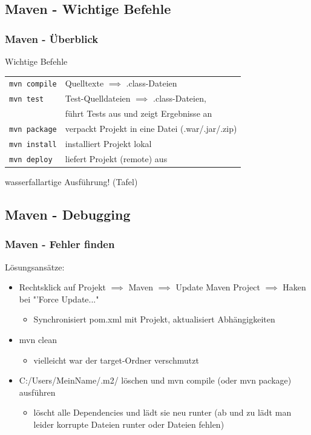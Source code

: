 \documentclass[18pt]{beamer}
\begin{document}
	\subsection{Maven - Wichtige Befehle}
	\begin{frame}
		\frametitle{Maven - Überblick}
		\begin{block}{Wichtige Befehle}
			\begin{tabular}{ll}
				\texttt{mvn compile} & Quelltexte $\implies$ .class-Dateien \\ \pause
				\texttt{mvn test} & Test-Quelldateien $\implies$ .class-Dateien, \\ & führt Tests aus und zeigt Ergebnisse an \\ \pause
				\texttt{mvn package} & verpackt Projekt in eine Datei (.war/.jar/.zip) \\ \pause 
				\texttt{mvn install} & installiert Projekt lokal \\ \pause
				\texttt{mvn deploy} & liefert Projekt (remote) aus
			\end{tabular}
		\end{block}
		wasserfallartige Ausführung! (Tafel)
	\end{frame}
	
	\subsection{Maven - Debugging}
	\begin{frame}
		\frametitle{Maven - Fehler finden}
		Lösungsansätze:
		\begin{itemize}
			\item Rechtsklick auf Projekt $\implies$ Maven $\implies$ Update Maven Project $\implies$ Haken bei "'Force Update..." 
			\begin{itemize}
				\item Synchronisiert pom.xml mit Projekt, aktualisiert Abhängigkeiten
			\end{itemize}
			\pause
			\item mvn clean
			\begin{itemize}
				\item vielleicht war der target-Ordner verschmutzt
			\end{itemize}
			\pause
			\item C:/Users/MeinName/.m2/ löschen und mvn compile (oder mvn package) ausführen
			\begin{itemize}
				\item löscht alle Dependencies und lädt sie neu runter (ab und zu lädt man leider korrupte Dateien runter oder Dateien fehlen)
			\end{itemize}
		\end{itemize}
	\end{frame}
	
\end{document}
